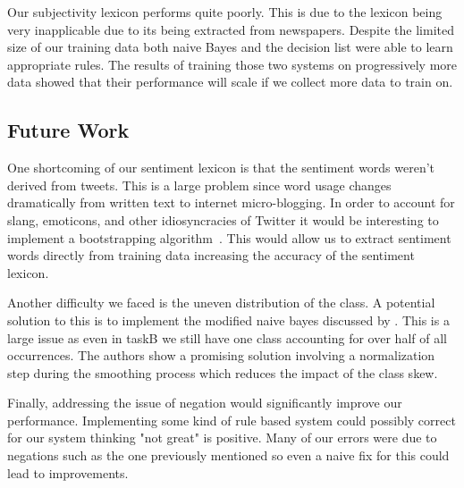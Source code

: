\documentclass[11pt]{article}
\begin{document}
Our subjectivity lexicon performs quite poorly. This is due to the lexicon being very inapplicable due to its being extracted from newspapers. Despite the limited size of our training data both naive Bayes and the decision list were able to learn appropriate rules. The results of training those two systems on progressively more data showed that their performance will scale if we collect more data to train on. 

\subsection{Future Work}
One shortcoming of our sentiment lexicon is that the sentiment words weren't derived from tweets. This is a large problem since word usage changes dramatically from written text to internet micro-blogging. In order to account for slang, emoticons, and other idiosyncracies of Twitter it would be interesting to implement a bootstrapping algorithm~\cite{Riloffbootstrapping}. This would allow us to extract sentiment words directly from training data increasing the accuracy of the sentiment lexicon.

Another difficulty we faced is the uneven distribution of the class. A potential solution to this is to implement the modified naive bayes discussed by \cite{FranknaiveBayes}. This is a large issue as even in taskB we still have one class accounting for over half of all occurrences. The authors show a promising solution involving a normalization step during the smoothing process which reduces the impact of the class skew.

Finally, addressing the issue of negation would significantly improve our performance. Implementing some kind of rule based system could possibly correct for our system thinking "not great" is positive. Many of our errors were due to negations such as the one previously mentioned so even a naive fix for this could lead to improvements.



\end{document}
